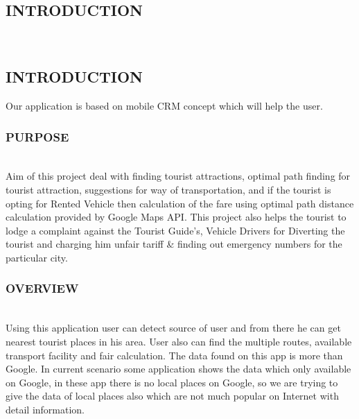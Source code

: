 \documentclass[12pt,a4paper]{article}
\begin{document}
\newpage
{}
\pagestyle{plain} 
\begin{center}
\section{INTRODUCTION}
\end{center}
\\
\subsection{INTRODUCTION}
\hspace{0.7 cm}Our application is based on mobile CRM concept which will help the user.
\\
\subsubsection{PURPOSE}
\\
\hspace{0.7 cm}Aim of this project deal with finding tourist attractions, optimal path finding for tourist attraction, suggestions for way of transportation, and if the tourist is opting for Rented Vehicle then calculation of the fare using optimal path distance calculation provided by Google Maps API. This project also helps the tourist to lodge a complaint against the Tourist Guide’s, Vehicle Drivers for Diverting the tourist and charging him unfair tariff & finding out emergency numbers for the particular city.
\\
\subsubsection{OVERVIEW}
\\
Using this application user can detect source of user and from there he can get nearest tourist places in his area. User also can find the multiple routes, available transport facility and fair calculation. The data found on this app is more than Google. In current scenario some application shows the data which only available  on Google, in these app there is no local places on Google, so we are trying to give the data of local places also which are not much popular on Internet with detail information.  
\\
\end{document}
